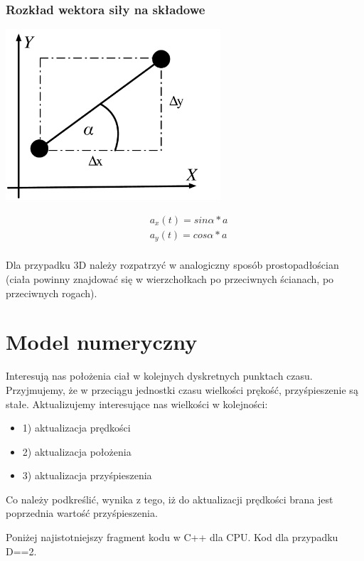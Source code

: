 \documentclass[fleqn]{article}
\begin{document}
\begin{frame}
\frametitle{Rozkład wektora siły na składowe}
\begin{center}
\includegraphics[width=8cm]{rozkladsil.pdf}
\end{center}
\end{frame}

\begin{align*}
    &a_{x}(t) = sin\alpha * a \\
    &a_{y}(t) = cos\alpha * a \\
\end{align*}

Dla przypadku 3D należy rozpatrzyć w analogiczny sposób prostopadłościan (ciała powinny znajdować się w wierzchołkach po przeciwnych ścianach, po przeciwnych rogach).

\section{Model numeryczny}
Interesują nas położenia ciał w kolejnych dyskretnych punktach czasu. Przyjmujemy, że w przeciągu jednostki czasu wielkości prękość, przyśpieszenie są stałe. Aktualizujemy interesujące nas wielkości w kolejności:
\begin{itemize}
    \item 1) aktualizacja prędkości
    \item 2) aktualizacja położenia
    \item 3) aktualizacja przyśpieszenia
\end{itemize}

Co należy podkreślić, wynika z tego, iż do aktualizacji prędkości brana jest poprzednia wartość przyśpieszenia.

Poniżej najistotniejszy fragment kodu w C++ dla CPU. Kod dla przypadku D==2.
\end{document}
